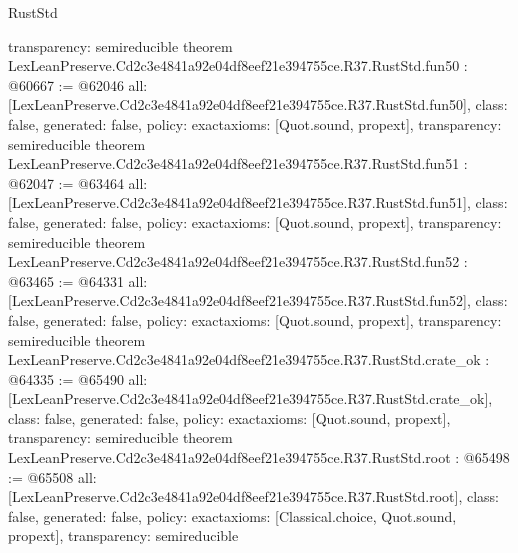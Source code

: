 \begin{lexlean}{RustStd}
\begin{coremodule}
{  transparency: semireducible
}
theorem LexLeanPreserve.Cd2c3e4841a92e04df8eef21e394755ce.R37.RustStd.fun50 : @60667 := @62046 {
  all: [LexLeanPreserve.Cd2c3e4841a92e04df8eef21e394755ce.R37.RustStd.fun50],
  class: false,
  generated: false,
  policy: exact{axioms: [Quot.sound, propext]},
  transparency: semireducible
}
theorem LexLeanPreserve.Cd2c3e4841a92e04df8eef21e394755ce.R37.RustStd.fun51 : @62047 := @63464 {
  all: [LexLeanPreserve.Cd2c3e4841a92e04df8eef21e394755ce.R37.RustStd.fun51],
  class: false,
  generated: false,
  policy: exact{axioms: [Quot.sound, propext]},
  transparency: semireducible
}
theorem LexLeanPreserve.Cd2c3e4841a92e04df8eef21e394755ce.R37.RustStd.fun52 : @63465 := @64331 {
  all: [LexLeanPreserve.Cd2c3e4841a92e04df8eef21e394755ce.R37.RustStd.fun52],
  class: false,
  generated: false,
  policy: exact{axioms: [Quot.sound, propext]},
  transparency: semireducible
}
theorem LexLeanPreserve.Cd2c3e4841a92e04df8eef21e394755ce.R37.RustStd.crate_ok : @64335 := @65490 {
  all: [LexLeanPreserve.Cd2c3e4841a92e04df8eef21e394755ce.R37.RustStd.crate_ok],
  class: false,
  generated: false,
  policy: exact{axioms: [Quot.sound, propext]},
  transparency: semireducible
}
theorem LexLeanPreserve.Cd2c3e4841a92e04df8eef21e394755ce.R37.RustStd.root : @65498 := @65508 {
  all: [LexLeanPreserve.Cd2c3e4841a92e04df8eef21e394755ce.R37.RustStd.root],
  class: false,
  generated: false,
  policy: exact{axioms: [Classical.choice, Quot.sound, propext]},
  transparency: semireducible
}


\end{coremodule}
\end{lexlean}
